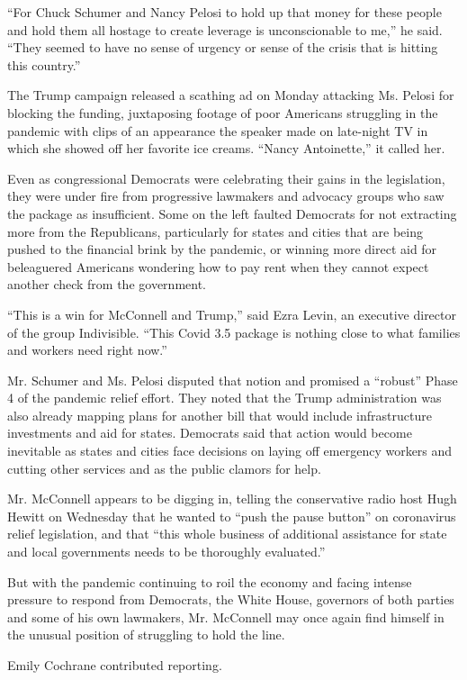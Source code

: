 ``For Chuck Schumer and Nancy Pelosi to hold up that money for these
people and hold them all hostage to create leverage is unconscionable to
me,'' he said. ``They seemed to have no sense of urgency or sense of the
crisis that is hitting this country.''

The Trump campaign released a scathing ad on Monday attacking Ms. Pelosi
for blocking the funding, juxtaposing footage of poor Americans
struggling in the pandemic with clips of an appearance the speaker made
on late-night TV in which she showed off her favorite ice creams.
``Nancy Antoinette,'' it called her.

Even as congressional Democrats were celebrating their gains in the
legislation, they were under fire from progressive lawmakers and
advocacy groups who saw the package as insufficient. Some on the left
faulted Democrats for not extracting more from the Republicans,
particularly for states and cities that are being pushed to the
financial brink by the pandemic, or winning more direct aid for
beleaguered Americans wondering how to pay rent when they cannot expect
another check from the government.

``This is a win for McConnell and Trump,'' said Ezra Levin, an executive
director of the group Indivisible. ``This Covid 3.5 package is nothing
close to what families and workers need right now.''

Mr. Schumer and Ms. Pelosi disputed that notion and promised a
``robust'' Phase 4 of the pandemic relief effort. They noted that the
Trump administration was also already mapping plans for another bill
that would include infrastructure investments and aid for states.
Democrats said that action would become inevitable as states and cities
face decisions on laying off emergency workers and cutting other
services and as the public clamors for help.

Mr. McConnell appears to be digging in, telling the conservative radio
host Hugh Hewitt on Wednesday that he wanted to ``push the pause
button'' on coronavirus relief legislation, and that ``this whole
business of additional assistance for state and local governments needs
to be thoroughly evaluated.''

But with the pandemic continuing to roil the economy and facing intense
pressure to respond from Democrats, the White House, governors of both
parties and some of his own lawmakers, Mr. McConnell may once again find
himself in the unusual position of struggling to hold the line.

Emily Cochrane contributed reporting.

